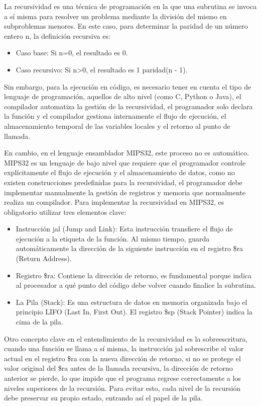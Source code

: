 \documentclass[12pt, letterpaper]{article}
\begin{document}
La recursividad es una técnica de programación en la que una subrutina se invoca a sí misma para resolver un problema mediante la división del mismo en subproblemas menores. En este caso, para determinar la paridad de un número entero n, la definición recursiva es:

\begin{itemize}
    \item Caso base: Si n=0, el resultado es 0.
    \item Caso recursivo: Si n>0, el resultado es 1 paridad(n - 1).
\end{itemize}

Sin embargo, para la ejecución en código, es necesario tener en cuenta el tipo de lenguaje de programación, aquellos de alto nivel (como C, Python o Java), el compilador automatiza la gestión de la recursividad, el programador solo declara la función y el compilador gestiona internamente el flujo de ejecución, el almacenamiento temporal de las variables locales y el retorno al punto de llamada.

En cambio, en el lenguaje ensamblador MIPS32, este proceso no es automático. MIPS32 es un lenguaje de bajo nivel que requiere que el programador controle explícitamente el flujo de ejecución y el almacenamiento de datos, como no existen construcciones predefinidas para la recursividad, el programador debe implementar manualmente la gestión de registros y memoria que normalmente realiza un compilador. Para implementar la recursividad en MIPS32, es obligatorio utilizar tres elementos clave:

\begin{itemize}
    \item Instrucción jal (Jump and Link): Esta instrucción transfiere el flujo de ejecución a la etiqueta de la función. Al mismo tiempo, guarda automáticamente la dirección de la siguiente instrucción en el registro \$ra (Return Address).
    \item Registro \$ra: Contiene la dirección de retorno, es fundamental porque indica al procesador a qué punto del código debe volver cuando finalice la subrutina.
    \item La Pila (Stack): Es una estructura de datos en memoria organizada bajo el principio LIFO (Last In, First Out). El registro \$sp (Stack Pointer) indica la cima de la pila.
\end{itemize}

Otro concepto clave en el entendimiento de la recursividad es la sobreescritura, cuando una función se llama a sí misma, la instrucción jal sobrescribe el valor actual en el registro \$ra con la nueva dirección de retorno, si no se protege el valor original del \$ra antes de la llamada recursiva, la dirección de retorno anterior se pierde, lo que impide que el programa regrese correctamente a los niveles superiores de la recursión. Para evitar esto, cada nivel de la recursión debe preservar su propio estado, entrando así el papel de la pila.
\end{document}
